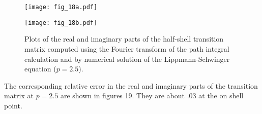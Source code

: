 \documentclass[aps,prc,reprint,noshowpacs,groupedaddress,onecolumn]{revtex4}
\begin{document}
\begin{figure}
\caption{Plots of the real and imaginary parts of the
half-shell transition
matrix computed using the Fourier transform of the path integral
calculation and by numerical solution of the Lippmann-Schwinger
equation ($p=2.5$).}
\begin{minipage}[t]{.45\linewidth}  
\centering
\texttt{[image: fig\_18a.pdf]}
\end{minipage}
\begin{minipage}[t]{.45\linewidth}  
\centering
\texttt{[image: fig\_18b.pdf]}
\end{minipage}
\label{figure 18}
\end{figure}

The corresponding relative error in the real and imaginary
parts of the transition matrix at $p=2.5$ are shown in figures 19.
They are about $.03$ at the on shell point.
\end{document}
